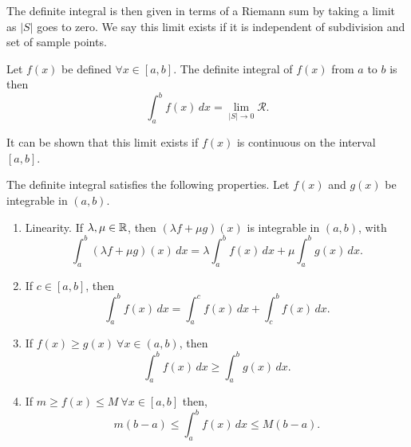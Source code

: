 \documentclass[10pt, a4paper]{article}
\begin{document}
The definite integral is then given in terms of a Riemann sum by taking a limit as $|S|$ goes to zero.
We say this limit exists if it is independent of subdivision and set of sample points.
\begin{definition}
    Let $f(x)$ be defined $\forall x \in [a, b]$.
    The definite integral of $f(x)$ from $a$ to $b$ is then
    \[
    \int_{a}^{b}f(x)\,dx = \lim_{|S| \rightarrow 0}\mathcal{R}.
    \]
\end{definition}
It can be shown that this limit exists if $f(x)$ is continuous on the interval $[a, b]$.

The definite integral satisfies the following properties.
Let $f(x)$ and $g(x)$ be integrable in $(a, b)$.
\begin{enumerate}[label = \roman*)]
    \item Linearity. If $\lambda, \mu \in \mathbb{R}$,
    then $(\lambda f + \mu g)(x)$ is integrable in $(a, b)$, with 
    \[
    \int_a^b(\lambda f + \mu g)(x)\,dx = \lambda \int_a^bf(x)\,dx + \mu\int_a^bg(x)\,dx.
    \]
    \item If $c \in [a, b]$, then
    \[
    \int_a^bf(x)\,dx = \int_a^cf(x)\,dx + \int_c^bf(x)\,dx.
    \]
    \item If $f(x) \geq g(x)\ \forall x \in (a, b)$,
    then
    \[
    \int_a^bf(x)\,dx \geq \int_a^bg(x)\,dx.
    \]
    \item If $m \geq f(x) \leq M\ \forall x \in [a, b]$ then,
    \[
    m(b - a) \leq \int_a^bf(x)\,dx \leq M(b - a).
    \]
\end{enumerate}
\end{document}
